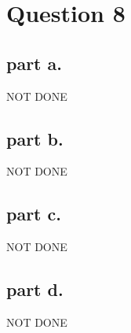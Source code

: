 \section{Question 8}

\subsection{part a.}
NOT DONE

\subsection{part b.}
NOT DONE

\subsection{part c.}
NOT DONE

\subsection{part d.}
NOT DONE
